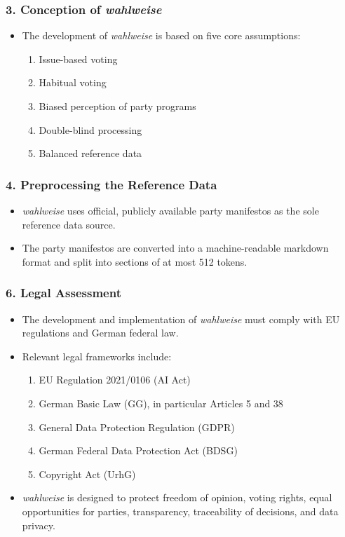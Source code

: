 \documentclass{article}
\begin{document}
\subsubsection*{3. Conception of \emph{wahlweise}}
\begin{itemize}
    \item The development of \emph{wahlweise} is based on five core assumptions:
    \begin{enumerate}
        \item Issue-based voting
        \item Habitual voting
        \item Biased perception of party programs
        \item Double-blind processing
        \item Balanced reference data
    \end{enumerate}
  
\end{itemize}

\subsubsection*{4. Preprocessing the Reference Data}
\begin{itemize}
    \item \emph{wahlweise} uses official, publicly available party manifestos as the sole reference data source.
    \item The party manifestos are converted into a machine-readable markdown format and split into sections of at most 512 tokens.
 
\end{itemize}



  

\subsubsection*{6. Legal Assessment}
\begin{itemize}
    \item The development and implementation of \emph{wahlweise} must comply with EU regulations and German federal law.
    \item Relevant legal frameworks include:
    \begin{enumerate}
        \item EU Regulation 2021/0106 (AI Act)
        \item German Basic Law (GG), in particular Articles 5 and 38
        \item General Data Protection Regulation (GDPR)
        \item German Federal Data Protection Act (BDSG)
        \item Copyright Act (UrhG)
    \end{enumerate}
    \item \emph{wahlweise} is designed to protect freedom of opinion, voting rights, equal opportunities for parties, transparency, traceability of decisions, and data privacy.
\end{itemize}
\end{document}
